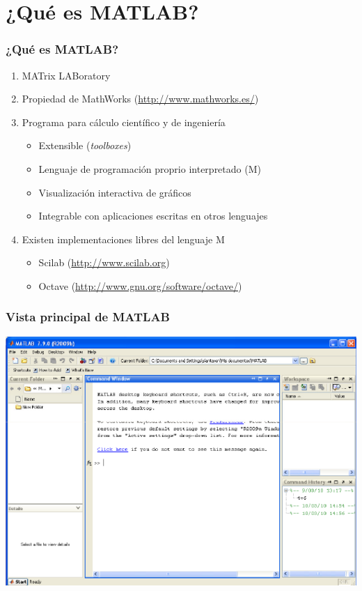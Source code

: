 \section{¿Qué es MATLAB?}
\begin{frame}[label=que_es]
    \frametitle{¿Qué es MATLAB?}
    \begin{enumerate}
        \item \alert{MAT}rix \alert{LAB}oratory
        \item Propiedad de MathWorks (\url{http://www.mathworks.es/})
        \item Programa para cálculo científico y de ingeniería
	\begin{itemize}
	 \item Extensible (\emph{toolboxes})
         \item Lenguaje de programación proprio interpretado (\alert{M})
         \item Visualización interactiva de gráficos
         \item Integrable con aplicaciones escritas en otros lenguajes
	\end{itemize}
        \item Existen implementaciones libres del lenguaje M
	\begin{itemize}
	 \item Scilab (\url{http://www.scilab.org})
	 \item Octave (\url{http://www.gnu.org/software/octave/})
	\end{itemize}
    \end{enumerate}
\end{frame}
\begin{frame}[label=vista_ppal]
 \frametitle{Vista principal de MATLAB}
  \begin{center}
   \includegraphics[width=0.7\paperwidth ]{images/matlab_vista_ppal}
  \end{center}
\end{frame}
